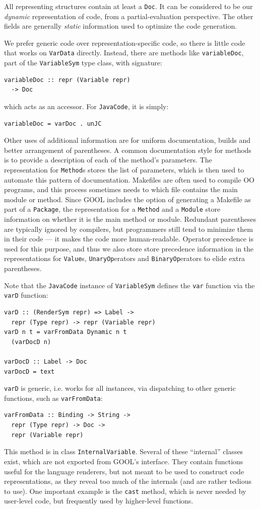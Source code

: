 \documentclass[sigplan,review,anonymous,prologue,dvipsnames]{acmart}
\begin{document}
All representing structures contain at least a \verb|Doc|. It can be considered
to be our \emph{dynamic} representation of code, from a partial-evaluation
perspective. The other fields are generally \emph{static} information used to
optimize the code generation.

We prefer generic code over representation-specific code, so there is little
code that works on \verb|VarData| directly.  Instead, there are
methods like \verb|variableDoc|, part of the \verb|VariableSym| type class,
with signature:
\begin{lstlisting}
variableDoc :: repr (Variable repr)
  -> Doc
\end{lstlisting}
which acts as an accessor.  For \verb|JavaCode|, it is simply:
\begin{lstlisting}
variableDoc = varDoc . unJC
\end{lstlisting}

Other uses of additional information are for uniform documentation,
builds and better arrangement of parentheses.
A common documentation style for methods is to provide a 
description of each of the method's parameters. The representation for 
\verb|Method|s stores the list of parameters, which is then used to
automate this pattern of documentation. Makefiles are often used to
compile OO programs, and this process sometimes needs to which file
contains the main module or method.  Since GOOL includes the option of 
generating a Makefile as part of a \verb|Package|, the representation for 
a \verb|Method| and a \verb|Module| store information on whether it is 
the main method or module. Redundant parentheses are typically ignored by 
compilers, but programmers still tend to minimize them in their code ---
it makes the code more human-readable. Operator precedence is used for
this purpose, and thus we also store
store precedence information in the representations for \verb|Value|s, 
\verb|UnaryOp|erators and \verb|BinaryOp|erators to elide extra
parentheses.

Note that the \verb|JavaCode| instance of \verb|VariableSym| defines the
\verb|var| function via the \verb|varD| function:
\begin{lstlisting}
varD :: (RenderSym repr) => Label ->
  repr (Type repr) -> repr (Variable repr)
varD n t = varFromData Dynamic n t
  (varDocD n)

varDocD :: Label -> Doc
varDocD = text
\end{lstlisting}
\verb|varD| is generic, i.e. works for all instances, via dispatching to other
generic functions, such as \verb|varFromData|:
\begin{lstlisting}
varFromData :: Binding -> String ->
  repr (Type repr) -> Doc ->
  repr (Variable repr)
\end{lstlisting}
This method is in class \verb|InternalVariable|. Several of these
``internal'' classes exist, which are not exported from GOOL's interface.
They contain functions useful for the language renderers, but
not meant to be used to construct code representations, as they reveal too
much of the internals (and are rather tedious to use).  One important
example is the \verb|cast| method, which is never needed by user-level code,
but frequently used by higher-level functions.
\end{document}

